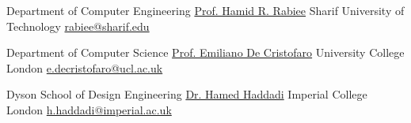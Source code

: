 \begin{cventries}
    
  \cventryc
    {Department of Computer Engineering}
    {\href{http://sharif.ir/~rabiee/}{Prof. Hamid R. Rabiee}}
    {Sharif University of Technology}
    {\href{mailto:rabiee@sharif.edu}{rabiee@sharif.edu}}
    
  \cventryc
    {Department of Computer Science}
    {\href{https://emilianodc.com/}{Prof. Emiliano De Cristofaro}}
    {University College London}
    {\href{mailto:e.decristofaro@ucl.ac.uk}{e.decristofaro@ucl.ac.uk}}
  
  \cventryc
    {Dyson School of Design Engineering}
    {\href{https://haddadi.github.io/}{Dr. Hamed Haddadi}}
    {Imperial College London}
    {\href{mailto:h.haddadi@imperial.ac.uk}{h.haddadi@imperial.ac.uk}}   
\end{cventries}
